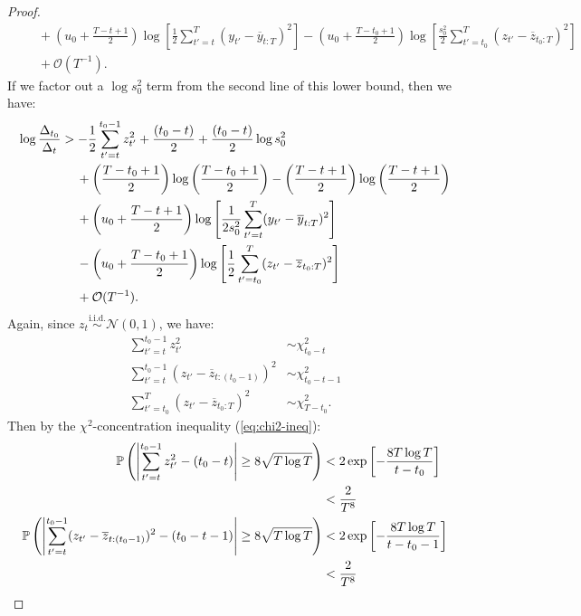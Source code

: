 \begin{proof}
\begin{align*}
    &\quad\: + \left(u_0 + \frac{T - t +1}{2}\right)\log\left[ \frac{1}{2}\sum_{t'=t}^T (y_{t'} - \overline{y}_{t:T})^2 \right] - \left(u_0 + \frac{T - t_0 +1}{2}\right)\log\left[\frac{s_0^2}{2}\sum_{t'=t_0}^T  (z_{t'} - \overline{z}_{t_0:T})^2 \right] \\
    &\quad\: +  \mathcal{O}(T^{-1}).
\end{align*}
If we factor out a $\log s_0^2$ term from the second line of this lower bound, then we have:
\begin{align}
    \log \frac{\Delta_{t_0}}{\Delta_t} &> - \frac{1}{2} \sum_{t' = t}^{t_0 - 1} z_{t'}^2 + \frac{(t_0-t)}{2} + \frac{(t_0-t)}{2}\log s_0^2 \notag \\
    &\quad\: + \left(\frac{T - t_0 + 1}{2}\right) \log\left(\frac{T-t_0+1}{2}\right) - \left(\frac{T - t + 1}{2}\right) \log\left(\frac{T-t+1}{2}\right) \notag\\
    &\quad\: + \left(u_0 + \frac{T - t +1}{2}\right)\log\left[ \frac{1}{2s_0^2}\sum_{t'=t}^T (y_{t'} - \overline{y}_{t:T})^2 \right] \notag\\
    &\quad\: - \left(u_0 + \frac{T - t_0 +1}{2}\right)\log\left[\frac{1}{2}\sum_{t'=t_0}^T  (z_{t'} - \overline{z}_{t_0:T})^2 \right] \notag\\
    &\quad\: +  \mathcal{O}(T^{-1}). \label{eq:thm3-cs2-bd1}
\end{align}
Again, since $z_{t} \overset{\text{i.i.d.}}{\sim} \mathcal{N}(0,1)$, we have:
\begin{align*}
    \sum_{t'=t}^{t_0-1} z^2_{t'} &\sim \chi^2_{t_0-t} \\
    \sum_{t'=t}^{t_0-1} (z_{t'} - \overline{z}_{t:(t_0-1)})^2 &\sim \chi^2_{t_0-t-1} \\
    \sum_{t'=t_0}^T (z_{t'} - \overline{z}_{t_0:T})^2 &\sim \chi^2_{T-t_0}.
\end{align*}
Then by the $\chi^2$-concentration inequality (\ref{eq:chi2-ineq}):
\begin{align}
    \mathbb{P}\left(\left|\sum_{t'=t}^{t_0-1} z^2_{t'} - (t_0 -t)\right| \geq 8\sqrt{T \log T}\right) &< 2 \exp\left[- 
    \frac{8 T \log T}{t-t_0} \right] \notag \\
    &<  \frac{2}{T^8} \label{eq:thm3-O1-inter} \\
    \mathbb{P}\left(\left|\sum_{t'=t}^{t_0-1} (z_{t'} - \overline{z}_{t:(t_0-1)})^2- (t_0 -t - 1)\right| \geq 8\sqrt{T \log T}\right) &< 2 \exp\left[- 
    \frac{8 T \log T}{t-t_0-1} \right] \notag \\
    &< \frac{2}{T^8} \label{eq:thm3-O2-inter} \\

\end{align}
\end{proof}
